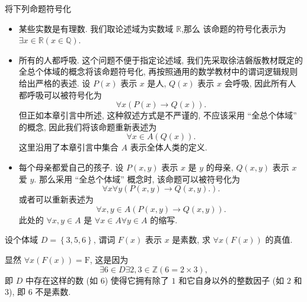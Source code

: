 \documentclass[10pt,UTF8]{book} %
\begin{document}
\begin{exercise}
    将下列命题符号化
    \begin{itemize}[itemsep=0pt]
        \item {\kaishu 某些实数是有理数}. 我们取论述域为实数域 $\mathbb{R}$,那么
        该命题的符号化表示为 $\exists x \in \mathbb{R}\left( x \in \mathbb{Q} \right)$.
        \item {\kaishu 所有的人都呼吸}. 这个问题不便于指定论述域, 我们先采取徐洁磐版教材既定的
        全总个体域的概念将该命题符号化, 再按照通用的数学教材中的谓词逻辑规则给出严格的表述. 
        设 $P(x)$ 表示 $x$ 是人, $Q(x)$ 表示 $x$ 会呼吸, 因此所有人都呼吸可以被符号化为
        \[ \forall x \left( P(x) \to Q(x) \right). \]
        但正如本章引言中所述, 这种叙述方式是不严谨的, 不应该采用 “全总个体域” 的概念,
        因此我们将该命题重新表述为
        \[ \forall x \in A \left( Q(x) \right). \]
        这里沿用了本章引言中集合 $A$ 表示全体人类的定义.
        \item {\kaishu 每个母亲都爱自己的孩子}. 设 $P(x,y)$ 表示 $x$ 是 $y$ 的母亲,
        $Q(x,y)$ 表示 $x$ 爱 $y$. 那么采用 “全总个体域” 概念时, 该命题可以被符号化为
        \[ \forall x \forall y \left(
            P(x,y) \to Q(x,y).
        \right). \]
        或者可以重新表述为
        \[ \forall x,y \in A \left( P(x,y) \to Q(x,y) \right). \]
        此处的 $\forall x,y \in A$ 是 $\forall x \in A \forall y \in A$ 的缩写.
    \end{itemize}
\end{exercise}

\begin{exercise}
    设个体域 $D = \left\{3,5,6\right\}$, 谓词 $F(x)$ 表示 $x$ 是素数, 求
    $\forall x \left( F(x) \right)$ 的真值.
    \begin{sol}
        显然 $\forall x \left( F(x) \right) = \mathrm{F}$, 这是因为
        \[ \exists 6 \in D \exists 2,3 \in \mathbb{Z} \left(
            6 = 2 \times 3
        \right), \]
        即 {\kaishu $D$ 中存在这样的数 (如 $6$) 使得它拥有除了 $1$ 和它自身以外的整数因子 (如 $2$ 和 $3$),
        即 $6$ 不是素数}.
    \end{sol}
\end{exercise}
\end{document}
